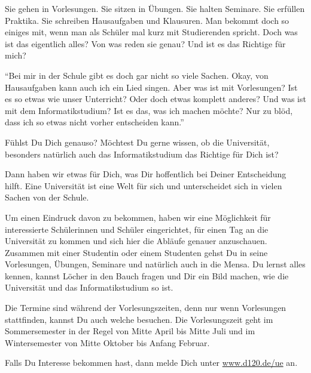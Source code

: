 {Sie gehen in Vorlesungen. Sie sitzen in Übungen. Sie halten Seminare. Sie erfüllen Praktika. Sie schreiben Hausaufgaben und Klausuren. Man bekommt doch so einiges mit, wenn man als Schüler mal kurz mit Studierenden spricht. Doch was ist das eigentlich alles? Von was reden sie genau? Und ist es das Richtige für mich?
}
{"`Bei mir in der Schule gibt es doch gar nicht so viele Sachen. Okay, von Hausaufgaben kann auch ich ein Lied singen. Aber was ist mit Vorlesungen? Ist es so etwas wie unser Unterricht? Oder doch etwas komplett anderes? Und was ist mit dem Informatikstudium? Ist es das, was ich machen möchte? Nur zu blöd, dass ich so etwas nicht vorher entscheiden kann."'



    Fühlst Du Dich genauso? Möchtest Du gerne wissen, ob die Universität, besonders natürlich auch das Informatikstudium das Richtige für Dich ist?

    Dann haben wir etwas für Dich, was Dir hoffentlich bei Deiner Entscheidung hilft. Eine Universität ist eine Welt für sich und unterscheidet sich in vielen Sachen von der Schule.

    Um einen Eindruck davon zu bekommen, haben wir eine Möglichkeit für interessierte Schülerinnen und Schüler eingerichtet, für einen Tag an die Universität zu kommen und sich hier die Abläufe genauer anzuschauen. Zusammen mit einer Studentin oder einem Studenten gehst Du in seine Vorlesungen, Übungen, Seminare und natürlich auch in die Mensa. Du lernst alles kennen, kannst Löcher in den Bauch fragen und Dir ein Bild machen, wie die Universität und das Informatikstudium so ist.

    Die Termine sind während der Vorlesungszeiten, denn nur wenn Vorlesungen stattfinden, kannst Du auch welche besuchen. Die Vorlesungszeit geht im Sommersemester in der Regel von Mitte April bis Mitte Juli und im Wintersemester von Mitte Oktober bis Anfang Februar.

    Falls Du Interesse bekommen hast, dann melde Dich unter \url{www.d120.de/ue} an.
}{}


\newpage
